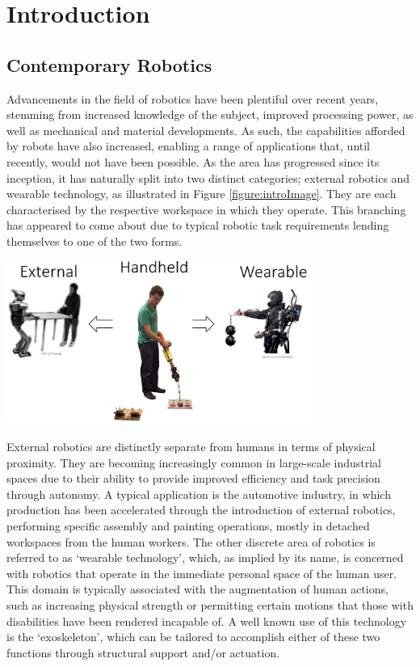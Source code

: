 \documentclass[11pt]{article}
\begin{document}
\setcounter{page}{1}%

\tableofcontents
\pagebreak


\pagestyle{mypage}
\section{Introduction}
\subsection{Contemporary Robotics}
Advancements in the field of robotics have been plentiful over recent years, stemming from increased knowledge of the subject, improved processing power, as well as mechanical and material developments. As such, the capabilities afforded by robots have also increased, enabling a range of applications that, until recently, would not have been possible. As the area has progressed since its inception, it has naturally split into two distinct categories; external robotics and wearable technology, as illustrated in Figure \ref{figure:introImage}. They are each characterised by the respective workspace in which they operate. This branching has appeared to come about due to typical robotic task requirements lending themselves to one of the two forms.


\begin{center}
\includegraphics[width=0.75\textwidth]{images/introImage.png}
\label{figure:introImage}
\end{center}

External robotics are distinctly separate from humans in terms of physical proximity. They are becoming increasingly common in large-scale industrial spaces due to their ability to provide improved efficiency and task precision through autonomy. A typical application is the automotive industry, in which production has been accelerated through the introduction of external robotics, performing specific assembly and painting operations, mostly in detached workspaces from the human workers. The other discrete area of robotics is referred to as `wearable technology', which, as implied by its name, is concerned with robotics that operate in the immediate personal space of the human user. This domain is typically associated with the augmentation of human actions, such as increasing physical strength or permitting certain motions that those with disabilities have been rendered incapable of. A well known use of this technology is the `exoskeleton', which can be tailored to accomplish either of these two functions through structural support and/or actuation.
\end{document}
